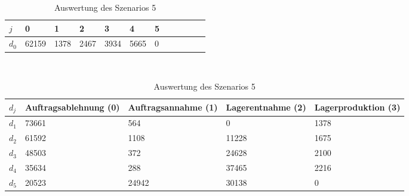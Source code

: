 \begin{table}[h!]
\renewcommand{\arraystretch}{1.5}
  \begin{center}
    \caption{Auswertung des Szenarios 5}  \label{AS5}
    \vspace*{3mm}
    \begin{tabular}{l l l l l l l l l l l l }  \hline 
         $j$ & 0 & 1  & 2 & 3 & 4  & 5   \\  \hline
$d_{0}$ &  62159 &  1378 &  2467 &  3934 &  5665 &  0 \\
\hline
    \end{tabular} \\[3mm]
        \begin{tabular}{ l p{2.5cm} p{2.5cm} p{2.5cm} p{2.5cm} }   \hline    %
    $d_j$ & Auftrags\-ablehnung (0) & Auftrags\-annahme (1)  & Lager\-entnahme (2) & Lager\-produktion (3)\\\hline 
$d_1$ &  73661 &    564 &    0 &  1378 \\
$d_2$ &  61592 &   1108 &  11228 &  1675 \\
$d_3$ &  48503 &    372 &  24628 &  2100 \\
$d_4$ &  35634 &    288 &  37465 &  2216 \\
$d_5$ &  20523 &  24942 &  30138 &   0 \\
          \hline
   \end{tabular} \\[3mm]
     \end{center}
\end{table}


